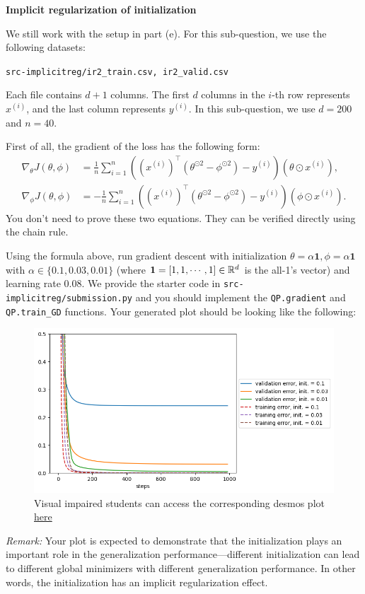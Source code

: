 \item {} \textbf{Implicit regularization of initialization}

We still work with the setup in part (e).
For this sub-question, we use the following datasets:
\begin{center}
	\texttt{src-implicitreg/ir2\_train.csv, ir2\_valid.csv}
\end{center}
Each file contains $d+1$ columns. The first $d$ columns in the $i$-th row represents $x^{(i)}$, and the last column represents $y^{(i)}.$ In this sub-question, we use $d=200$ and $n=40$.

First of all, the gradient of the loss has the following form:
\begin{align}
	\nabla_\theta J(\theta,\phi)&=\frac{1}{n}\sum_{i=1}^{n}((x^{(i)})^\top (\theta^{\odot 2} -\phi^{\odot 2})-y^{(i)})(\theta\odot x^{(i)}),\\
	\nabla_\phi J(\theta,\phi)&=-\frac{1}{n}\sum_{i=1}^{n}((x^{(i)})^\top (\theta^{\odot 2} -\phi^{\odot 2})-y^{(i)})(\phi\odot x^{(i)}).
\end{align}
You don't need to prove these two equations. They can be verified directly using the chain rule.

Using the formula above, run gradient descent with initialization $\theta=\alpha \mathbf{1}, \phi=\alpha\mathbf{1}$ with $\alpha\in \{0.1, 0.03, 0.01\}$ (where $\mathbf{1}=[1,1,\cdots,1]\in\mathbb{R}^{d}$ is the all-1's vector) and learning rate $0.08$. We provide the starter code in \texttt{src-implicitreg/submission.py} and you should implement the \texttt{QP.gradient} and \texttt{QP.train\_GD} functions. Your generated plot should be looking like the following:

\begin{figure}[H]
	\centering
	\includegraphics[width=.7\linewidth]{04-implicitreg/implicitreg_quadratic_initialization.png}
	\caption{Visual impaired students can access the corresponding desmos plot \href{https://www.desmos.com/calculator/scqmmrwkuj}{here}}
\end{figure}

\textit{Remark:} Your plot is expected to demonstrate that the initialization plays an important role in the generalization performance---different initialization can lead to different global minimizers with different generalization performance. In other words, the initialization has an implicit regularization effect. 
